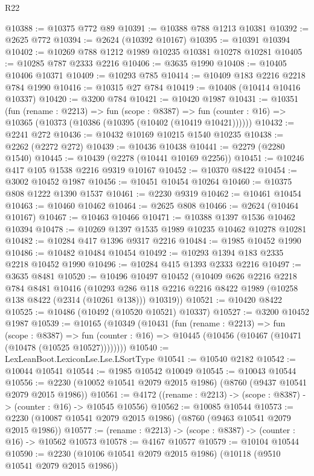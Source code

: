 \begin{lexlean}{R22}
\begin{coremodule}
@10388 := @10375 @772 @89
@10391 := @10388 @788 @1213 @10381
@10392 := @2625 @772
@10394 := @2624 (@10392 @10167)
@10395 := @10391 @10394
@10402 := @10269 @788 @1212 @1989 @10235 @10381 @10278 @10281
@10405 := @10285 @787 @2333 @2216
@10406 := @3635 @1990
@10408 := @10405 @10406 @10371
@10409 := @10293 @785
@10414 := @10409 @183 @2216 @2218 @784 @1990
@10416 := @10315 @27 @784
@10419 := @10408 (@10414 @10416 @10337)
@10420 := @3200 @784
@10421 := @10420 @1987
@10431 := @10351
    (fun (rename : @2213) =>
    fun (scope : @8387) =>
    fun (counter : @16) => @10365 (@10373 (@10386 (@10395 (@10402 (@10419 @10421))))))
@10432 := @2241 @272
@10436 := @10432 @10169 @10215 @1540 @10235
@10438 := @2262 (@2272 @272)
@10439 := @10436 @10438
@10441 := @2279 (@2280 @1540)
@10445 := @10439 (@2278 (@10441 @10169 @2256))
@10451 := @10246 @417 @105 @1538 @2216 @9319 @10167
@10452 := @10370 @8422
@10454 := @3002 @10452 @1987
@10456 := @10451 @10454 @10264
@10460 := @10375 @808 @1222 @1390 @1537
@10461 := @2230 @9319
@10462 := @10461 @10454
@10463 := @10460 @10462
@10464 := @2625 @808
@10466 := @2624 (@10464 @10167)
@10467 := @10463 @10466
@10471 := @10388 @1397 @1536 @10462 @10394
@10478 := @10269 @1397 @1535 @1989 @10235 @10462 @10278 @10281
@10482 := @10284 @417 @1396 @9317 @2216
@10484 := @1985 @10452 @1990
@10486 := @10482 @10484 @10454
@10492 := @10293 @1394 @183 @2335 @2218 @10452 @1990
@10496 := @10284 @415 @1393 @2333 @2216
@10497 := @3635 @8481
@10520 := @10496
    @10497
    @10452
    (@10409
      @626
      @2216
      @2218
      @784
      @8481
      @10416
      (@10293 @286 @118 @2216 @2216 @8422 @1989 (@10258 @138 @8422 (@2314 (@10261 @138))) @10319))
@10521 := @10420 @8422
@10525 := @10486 (@10492 (@10520 @10521) @10337)
@10527 := @3200 @10452 @1987
@10539 := @10165
    (@10349
      (@10431
        (fun (rename : @2213) =>
        fun (scope : @8387) =>
        fun (counter : @16) => @10445 (@10456 (@10467 (@10471 (@10478 (@10525 @10527))))))))
@10540 := LexLeanBoot.LexiconLse.Lse.LSortType
@10541 := @10540 @2182
@10542 := @10044 @10541
@10544 := @1985 @10542 @10049
@10545 := @10043 @10544
@10556 := @2230 (@10052 @10541 @2079 @2015 @1986) (@8760 (@9437 @10541 @2079 @2015 @1986))
@10561 := @4172 ((rename : @2213) -> (scope : @8387) -> (counter : @16) -> @10545 @10556)
@10562 := @10085 @10544
@10573 := @2230 (@10087 @10541 @2079 @2015 @1986) (@8760 (@9463 @10541 @2079 @2015 @1986))
@10577 := (rename : @2213) -> (scope : @8387) -> (counter : @16) -> @10562 @10573
@10578 := @4167 @10577
@10579 := @10104 @10544
@10590 := @2230 (@10106 @10541 @2079 @2015 @1986) (@10118 (@9510 @10541 @2079 @2015 @1986))

\end{coremodule}
\end{lexlean}
